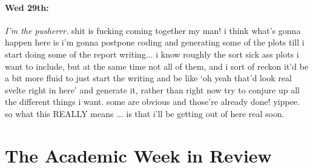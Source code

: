 \documentclass[12pt]{article}
\begin{document}
\paragraph{Wed 29th:} \textit{I'm the pusherrr.} shit is fucking coming together my man! i think what's gonna happen here is i'm gonna postpone coding and generating some of the plots till i start doing some of the report writing... i know roughly the sort sick ass plots i want to include, but at the same time not all of them, and i sort of reckon it'd be a bit more fluid to just start the writing and be like `oh yeah that'd look real svelte right in here' and generate it, rather than right now try to conjure up all the different things i want. some are obvious and those're already done! yippee. so what this REALLY means ... is that i'll be getting out of here real soon.

\section*{The Academic Week in Review}
\end{document}
